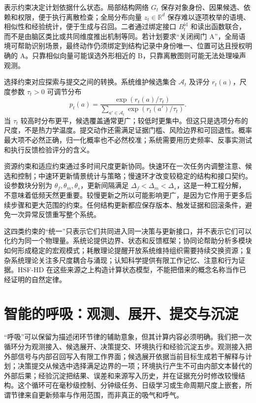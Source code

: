 表示约束决定计划依据什么状态。局部结构网络 $G_t$ 保存对象身份、因果候选、依赖和权限，便于执行离散检查；全局分布向量 $z_t\in\mathbb R^d$ 保存难以逐项枚举的语境、相似性和经验统计，便于生成与召回。二者通过绑定接口 $B_t^{\mathrm{id}}$ 和读出函数联合，而不是由脑区类比或共同维度推出机制等同。若计划要求“关闭阀门 A”，全局语境可帮助识别场景，最终动作仍须绑定到结构记录中身份唯一、位置可达且授权明确的 A。只靠相似向量可能误选外形相近的 B，只靠离散图则可能无法处理噪声观测。

选择约束对应探索与提交之间的转换。系统维护候选集合 $\mathcal A_t$ 及评分 $r_t(a)$，尺度参数 $\tau_t>0$ 可调节分布
\begin{equation}
  p_t(a)=\frac{\exp(r_t(a)/\tau_t)}
  {\sum_{a'\in\mathcal A_t}\exp(r_t(a')/\tau_t)}.
\end{equation}
当 $\tau_t$ 较高时分布更平，候选覆盖通常更广；较低时更集中。但这只是选项分布的尺度，不是热力学温度。提交动作还需满足证据门槛、风险边界和可回退性。概率最大项不必然正确，归一化概率也不必然校准；系统需要用历史频率、反事实测试和执行反馈检验评分的含义。

资源约束和适应约束通过多时间尺度更新协同。快速环在一次任务内调整注意、候选和控制；中速环更新情景统计与策略；慢速环才改变较稳定的结构和接口契约。设参数块分别为 $\theta_f,\theta_m,\theta_s$，更新间隔满足 $\Delta_f<\Delta_m<\Delta_s$，这是一种工程分解，不意味着低频天然更重要。较慢更新之所以可能影响更广，是因为它作用于更多后续步骤和更大范围的约束。任何结构更新都应保存版本、触发证据和回滚条件，避免一次异常反馈重写整个系统。

这四类约束的“统一”只表示它们共同进入同一决策与更新接口，并不表示它们可以化约为同一个物理量。系统论提供边界、状态和反馈框架；协同论帮助分析多模块如何形成稳定的宏观模式；耗散理论提醒开放系统维持组织需要持续交换资源；复杂系统理论关注多尺度耦合与涌现；认知科学提供有限工作记忆、注意和行为证据。HSF-HD 在这些来源之上构造计算状态模型，不能把借来的概念名称当作已经证明的自然定律。

\section{智能的呼吸：观测、展开、提交与沉淀}
\label{sec:section_167}

“呼吸”可以保留为描述闭环节律的辅助意象，但其计算内容必须明确。我们把一次循环分为观测接入、候选展开、决策提交、环境执行和经验沉淀五步。观测接入把外部信号与内部召回写入有限工作界面；候选展开依据当前目标生成若干解释与计划；决策提交从候选中选择满足边界的一项；环境执行产生不可由内部文本替代的外部后果；经验沉淀把结果、误差和来源写入历史，并在证据充分时修改较慢结构。这个循环可在毫秒级控制、分钟级任务、日级学习或生命周期尺度上嵌套，所谓节律来自更新频率与作用范围，而非真正的吸气和呼气。


